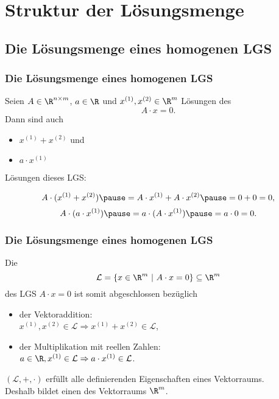 \section{Struktur der Lösungsmenge}

\subsection{Die Lösungsmenge eines homogenen LGS}
\makeSectionDividerPage
%
\begin{frame}\frametitle{Die Lösungsmenge eines homogenen LGS}

	Seien $A\in\R^{n\times m}$, $a \in\R$ und $x^{(1)}, x^{(2)} \in \R^{m}$ Lösungen des 
	$$
		A\cdot x = 0.
	$$
	Dann sind auch
	\begin{itemize}
		\item $x^{(1)} + x^{(2)}$ und
		\item $a\cdot x^{(1)}$  
	\end{itemize}
	Lösungen dieses LGS:\pause
	
	$$
		A\cdot(x^{(1)} + x^{(2)}) \pause = A\cdot x^{(1)} + A\cdot x^{(2)}\pause =0+0= 0,
	$$ 
\pause
	$$
		A\cdot (a\cdot x^{(1)}) \pause= a\cdot (A\cdot x^{(1)})\pause =a\cdot 0= 0.
	$$  
	
\end{frame}
%
%
\begin{frame}\frametitle{Die Lösungsmenge eines homogenen LGS}

	Die 
	$$
		\mathcal{L} = \{ x \in \R^m ~|~ A\cdot x = 0\} \subseteq \R^m
	$$ 
	des LGS $A\cdot x=0$ ist somit abgeschlossen bezüglich 
	\begin{itemize}
		\item der Vektoraddition:\\ 
			$x^{(1)}, x^{(2)}\in \mathcal{L} \Rightarrow x^{(1)} + x^{(2)}\in \mathcal{L}$,
		\item der Multiplikation mit reellen Zahlen:\\ 
			$a\in \R, x^{(1)}\in \mathcal{L} \Rightarrow a\cdot x^{(1)}\in \mathcal{L}$. 
	\end{itemize}
	
	\pause
	\vspace{6mm}
	$(\mathcal{L},+,\cdot)$ erfüllt alle definierenden Eigenschaften eines Vektorraums.\\[2mm]
	
	Deshalb bildet
	 einen  des Vektorraums $\R^m$. 
	
\end{frame}
%
%
